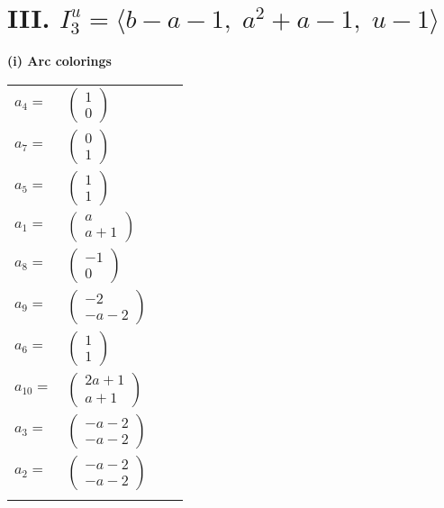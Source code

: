 \documentclass[1p]{elsarticle_modified}
\theoremstyle{definition}
\begin{document}
\centering \section*{III. $I^u_{3}= \langle b- a-1,\;a^2+a-1,\;u-1 \rangle$}
\flushleft \textbf{(i) Arc colorings}\\
\begin{tabular}{m{7pt} m{180pt} m{7pt} m{180pt} }
\flushright $a_{4}=$&$\begin{pmatrix}1\\0\end{pmatrix}$ \\
\flushright $a_{7}=$&$\begin{pmatrix}0\\1\end{pmatrix}$ \\
\flushright $a_{5}=$&$\begin{pmatrix}1\\1\end{pmatrix}$ \\
\flushright $a_{1}=$&$\begin{pmatrix}a\\a+1\end{pmatrix}$ \\
\flushright $a_{8}=$&$\begin{pmatrix}-1\\0\end{pmatrix}$ \\
\flushright $a_{9}=$&$\begin{pmatrix}-2\\- a-2\end{pmatrix}$ \\
\flushright $a_{6}=$&$\begin{pmatrix}1\\1\end{pmatrix}$ \\
\flushright $a_{10}=$&$\begin{pmatrix}2 a+1\\a+1\end{pmatrix}$ \\
\flushright $a_{3}=$&$\begin{pmatrix}- a-2\\- a-2\end{pmatrix}$ \\
\flushright $a_{2}=$&$\begin{pmatrix}- a-2\\- a-2\end{pmatrix}$\\&\end{tabular}
\end{document}
